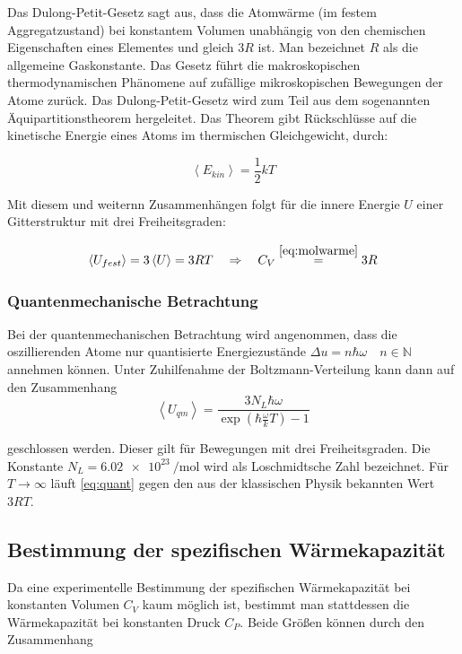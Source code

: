 Das Dulong-Petit-Gesetz sagt aus, dass die Atomwärme (im festem Aggregatzustand) bei %
konstantem Volumen unabhängig von den chemischen Eigenschaften eines Elementes
und gleich $3R$ ist. %
Man bezeichnet $R$ als die allgemeine Gaskonstante. %
Das Gesetz führt die makroskopischen thermodynamischen Phänomene
auf zufällige mikroskopischen Bewegungen der Atome zurück. %
Das Dulong-Petit-Gesetz wird zum Teil aus dem %
sogenannten Äquipartitionstheorem hergeleitet.
Das Theorem gibt Rückschlüsse auf die kinetische Energie eines Atoms %
im thermischen Gleichgewicht, durch:

\begin{equation*}
\left< E_{kin} \right>=\frac{1}{2}kT
\end{equation*}

Mit diesem und weiternn Zusammenhängen folgt für die innere Energie $U$ %
einer Gitterstruktur mit drei Freiheitsgraden:

\begin{equation*}
\left< U_{fest} \right> = 3 \left< U \right>=3RT \quad \Rightarrow \quad C_{V}\overset{\eqref{eq:molwarme}}{=}3R
\end{equation*}

\subsubsection{Quantenmechanische Betrachtung}
Bei der quantenmechanischen Betrachtung wird angenommen,
dass die oszillierenden Atome nur quantisierte Energiezustände $\Delta u=n\hbar \omega \quad n\in\mathbb{N}$
annehmen können.
Unter Zuhilfenahme der Boltzmann-Verteilung kann dann auf den Zusammenhang  %
\begin{equation}
\label{eq:quant}
\left< U_{qm} \right> =\frac{3N_L \hbar \omega}{\exp\left(\hbar \frac{\omega}{k} T\right) -1}
\end{equation}

geschlossen werden. Dieser gilt für Bewegungen mit drei Freiheitsgraden.
Die Konstante $N_L = \SI{6.02e23}{\per\mol}$ wird als Loschmidtsche Zahl bezeichnet.
Für $T\to\infty$ läuft \eqref{eq:quant} gegen den aus der klassischen Physik bekannten Wert %
$3RT$.

\subsection{Bestimmung der spezifischen Wärmekapazität}
Da eine experimentelle Bestimmung der spezifischen Wärmekapazität
bei konstanten Volumen $C_V$ kaum möglich ist, %
bestimmt man stattdessen die Wärmekapazität bei konstanten Druck $C_P$. %
Beide Größen können durch den Zusammenhang %

